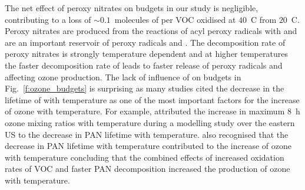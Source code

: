 \vspace{-5mm}
The net effect of peroxy nitrates on  budgets in our study is negligible, contributing to a loss of $\sim0.1$~molecules of  per VOC oxidised at $40$~\degree C from $20$~\degree C.
Peroxy nitrates are produced from the reactions of acyl peroxy radicals with  and are an important reservoir of peroxy radicals and .
The decomposition rate of peroxy nitrates is strongly temperature dependent and at higher temperatures the faster decomposition rate of  leads to faster release of peroxy radicals and  affecting ozone production.
The lack of influence of  on  budgets in Fig.~\ref{f:ozone_budgets} is surprising as many studies cited the decrease in the lifetime of  with temperature as one of the most important factors for the increase of ozone with temperature.
For example, \citet{Dawson:2007} attributed the increase in maximum 8~h ozone mixing ratios with temperature during a modelling study over the eastern US to the decrease in PAN lifetime with temperature.
\citet{Steiner:2006} also recognised that the decrease in PAN lifetime with temperature contributed to the increase of ozone with temperature concluding that the combined effects of increased oxidation rates of VOC and faster PAN decomposition increased the production of ozone with temperature.

